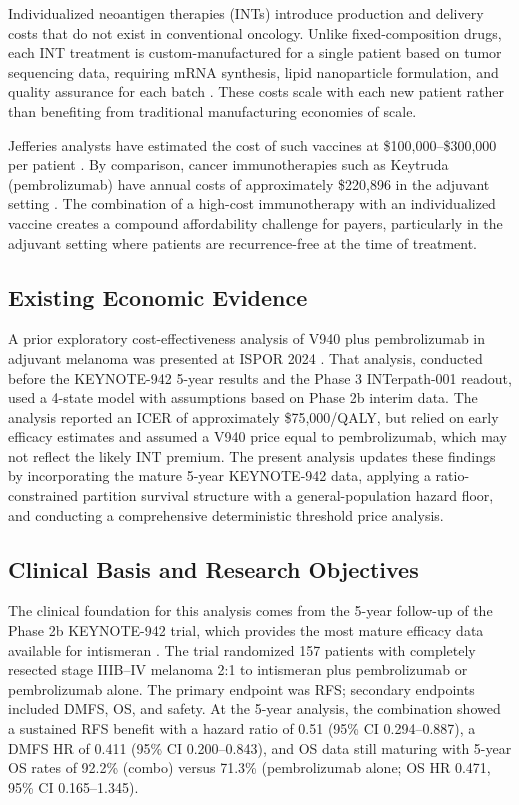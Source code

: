 \documentclass[12pt,a4paper]{article}
\begin{document}
Individualized neoantigen therapies (INTs) introduce production and delivery costs that do not exist in conventional oncology. Unlike fixed-composition drugs, each INT treatment is custom-manufactured for a single patient based on tumor sequencing data, requiring mRNA synthesis, lipid nanoparticle formulation, and quality assurance for each batch \cite{ibragimova2025, li2026}. These costs scale with each new patient rather than benefiting from traditional manufacturing economies of scale.

Jefferies analysts have estimated the cost of such vaccines at \$100,000--\$300,000 per patient \cite{jefferies2026}. By comparison, cancer immunotherapies such as Keytruda\textregistered{} (\mbox{pembrolizumab}) have annual costs of approximately \$220,896 in the adjuvant setting \cite{keytruda2026}. The combination of a high-cost immunotherapy with an individualized vaccine creates a compound affordability challenge for payers, particularly in the adjuvant setting where patients are recurrence-free at the time of treatment.

\subsection{Existing Economic Evidence}

A prior exploratory cost-effectiveness analysis of V940 plus \mbox{pembrolizumab} in adjuvant melanoma was presented at ISPOR 2024 \cite{mclean2024}. That analysis, conducted before the \mbox{KEYNOTE-942} 5-year results and the Phase 3 \mbox{INTerpath-001} readout, used a 4-state model with assumptions based on Phase 2b interim data. The analysis reported an ICER of approximately \$75,000/QALY, but relied on early efficacy estimates and assumed a V940 price equal to \mbox{pembrolizumab}, which may not reflect the likely INT premium. The present analysis updates these findings by incorporating the mature 5-year \mbox{KEYNOTE-942} data, applying a ratio-constrained partition survival structure with a general-population hazard floor, and conducting a comprehensive deterministic threshold price analysis.

\subsection{Clinical Basis and Research Objectives}

The clinical foundation for this analysis comes from the 5-year follow-up of the Phase 2b \mbox{KEYNOTE-942} trial, which provides the most mature efficacy data available for intismeran \cite{khattak2026}. The trial randomized 157 patients with completely resected stage IIIB--IV melanoma 2:1 to intismeran plus \mbox{pembrolizumab} or \mbox{pembrolizumab} alone. The primary endpoint was RFS; secondary endpoints included DMFS, OS, and safety. At the 5-year analysis, the combination showed a sustained RFS benefit with a hazard ratio of 0.51 (95\% CI 0.294--0.887), a DMFS HR of 0.411 (95\% CI 0.200--0.843), and OS data still maturing with 5-year OS rates of 92.2\% (combo) versus 71.3\% (\mbox{pembrolizumab} alone; OS HR 0.471, 95\% CI 0.165--1.345).
\end{document}
